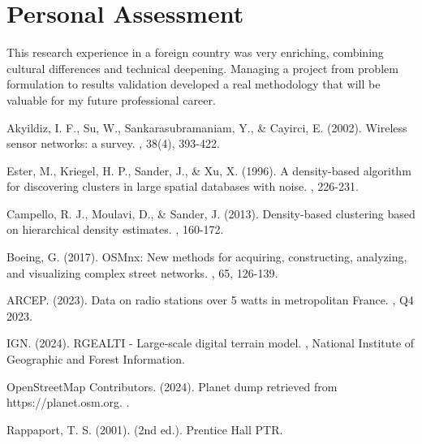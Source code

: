 \documentclass[12pt,a4paper]{report}
\begin{document}
\section*{Personal Assessment}

This research experience in a foreign country was very enriching, combining cultural differences and technical deepening. Managing a project from problem formulation to results validation developed a real methodology that will be valuable for my future professional career.



\begin{thebibliography}{40}

Akyildiz, I. F., Su, W., Sankarasubramaniam, Y., \& Cayirci, E. (2002).
\newblock Wireless sensor networks: a survey.
, 38(4), 393-422.

Ester, M., Kriegel, H. P., Sander, J., \& Xu, X. (1996).
\newblock A density-based algorithm for discovering clusters in large spatial databases with noise.
, 226-231.

Campello, R. J., Moulavi, D., \& Sander, J. (2013).
\newblock Density-based clustering based on hierarchical density estimates.
, 160-172.

Boeing, G. (2017).
\newblock OSMnx: New methods for acquiring, constructing, analyzing, and visualizing complex street networks.
, 65, 126-139.

ARCEP. (2023).
\newblock Data on radio stations over 5 watts in metropolitan France.
, Q4 2023.

IGN. (2024).
\newblock RGEALTI - Large-scale digital terrain model.
, National Institute of Geographic and Forest Information.

OpenStreetMap Contributors. (2024).
\newblock Planet dump retrieved from https://planet.osm.org.
.

Rappaport, T. S. (2001).
 (2nd ed.).
\newblock Prentice Hall PTR.


\end{thebibliography}
\end{document}
